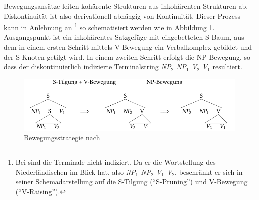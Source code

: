 Bewegungsansätze leiten kohärente Strukturen aus inkohärenten Strukturen ab. Diskontinuität ist also derivationell abhängig von Kontinuität. Dieser Prozess kann in Anlehnung an \citet[(1)]{Evers:75}\footnote{Bei \citet[(1)]{Evers:75} sind die Terminale nicht indiziert. Da er die Wortstellung des Niederländischen im Blick hat, also {\it NP$_1$ NP$_2$ V$_1$ V$_2$}, beschränkt er sich in seiner Schemadarstellung auf die S-Tilgung ("`S-Pruning"') und V-Bewegung ("`V-Raising"').} so schematisiert werden wie in Abbildung \ref{fig-ttmctag-kohaerenz-1}. Ausgangspunkt ist ein inkohärentes Satzgefüge mit eingebetteten S-Baum, aus dem in einem ersten Schritt mittels V-Bewegung ein Verbalkomplex gebildet und der S-Knoten getilgt wird. In einem zweiten Schritt erfolgt die NP-Bewegung, so dass der diskontinuierlich indizierte Terminalstring {\it NP$_2$ NP$_1$ V$_2$ V$_1$} resultiert.  

\begin{figure}
\centering
\includegraphics{graphics/abb62.pdf}
\caption{\label{fig-ttmctag-kohaerenz-1}Bewegungsstrategie nach \citet[(1a), (1b)]{Evers:75}}
\end{figure}

